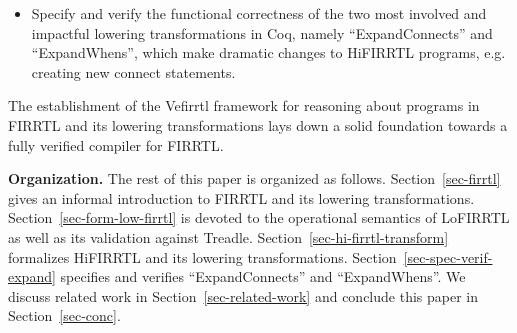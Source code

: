 \begin{itemize}
%
\item Specify and verify the functional correctness of the two most involved and impactful lowering transformations in Coq, namely ``ExpandConnects'' and ``ExpandWhens'', which  make dramatic changes to HiFIRRTL programs, e.g. creating new connect statements.
\end{itemize}
The establishment of the Vefirrtl framework for reasoning about programs in FIRRTL and its lowering transformations lays down a solid foundation towards a fully verified compiler for FIRRTL.

\smallskip
\noindent
{\bf Organization.}
The rest of this paper is organized as follows. Section~\ref{sec-firrtl} gives an informal introduction to FIRRTL and its lowering transformations. Section~\ref{sec-form-low-firrtl} is devoted to the  operational semantics of LoFIRRTL as well as its validation against Treadle. Section~\ref{sec-hi-firrtl-transform} formalizes HiFIRRTL and its lowering transformations. Section~\ref{sec-spec-verif-expand} specifies and verifies ``ExpandConnects'' and ``ExpandWhens''. We discuss related work in Section~\ref{sec-related-work}
and conclude this paper in Section~\ref{sec-conc}.



